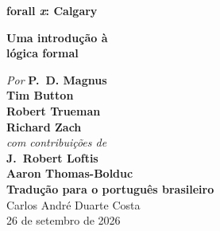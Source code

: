 
\ifHTMLtarget\else

\pagestyle{empty}

\vspace*{80pt}

\begin{raggedleft}
\fontsize{30pt}{24pt}\sffamily
\selectfont
  \textbf{forall 
  {\fontsize{37pt}{24pt}\selectfont\rmfamily\textit{x}}: 
  Calgary}

\medskip\fontsize{18pt}{20pt}\selectfont

\textbf{Uma introdução à\\ lógica formal}

\vfill
\fontsize{12pt}{16pt}\selectfont \textit{Por } \textbf{P.~D. Magnus}\\
\textbf{Tim Button}\\
\textbf{Robert Trueman}\\
\textbf{Richard Zach}\\
\textit{com contribuições de}\\
\textbf{J.~Robert Loftis}\\
\textbf{Aaron Thomas-Bolduc}\\

\medskip
\textbf{Tradução para o português brasileiro}\\
Carlos André Duarte Costa\\
26 de setembro de 2026

\vfill
\textbf{\forallxversion}\par
\end{raggedleft}

\newpage

